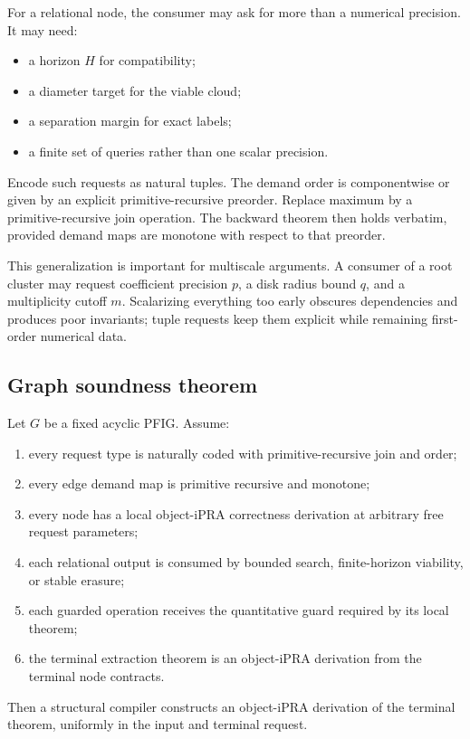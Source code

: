 For a relational node, the consumer may ask for more than a numerical precision.  It may need:

\begin{itemize}
\item a horizon \(H\) for compatibility;
\item a diameter target for the viable cloud;
\item a separation margin for exact labels;
\item a finite set of queries rather than one scalar precision.
\end{itemize}

Encode such requests as natural tuples.  The demand order is componentwise or given by an explicit primitive-recursive preorder.  Replace maximum by a primitive-recursive join operation.  The backward theorem then holds verbatim, provided demand maps are monotone with respect to that preorder.

This generalization is important for multiscale arguments.  A consumer of a root cluster may request coefficient precision \(p\), a disk radius bound \(q\), and a multiplicity cutoff \(m\).  Scalarizing everything too early obscures dependencies and produces poor invariants; tuple requests keep them explicit while remaining first-order numerical data.

\subsection{Graph soundness theorem}

\begin{theorem}
\label{thm:pfig-soundness}
Let \(G\) be a fixed acyclic PFIG.  Assume:

\begin{enumerate}
\item every request type is naturally coded with primitive-recursive join and order;
\item every edge demand map is primitive recursive and monotone;
\item every node has a local object-iPRA correctness derivation at arbitrary free request parameters;
\item each relational output is consumed by bounded search, finite-horizon viability, or stable erasure;
\item each guarded operation receives the quantitative guard required by its local theorem;
\item the terminal extraction theorem is an object-iPRA derivation from the terminal node contracts.
\end{enumerate}

Then a structural compiler constructs an object-iPRA derivation of the terminal theorem, uniformly in the input and terminal request.
\end{theorem}


